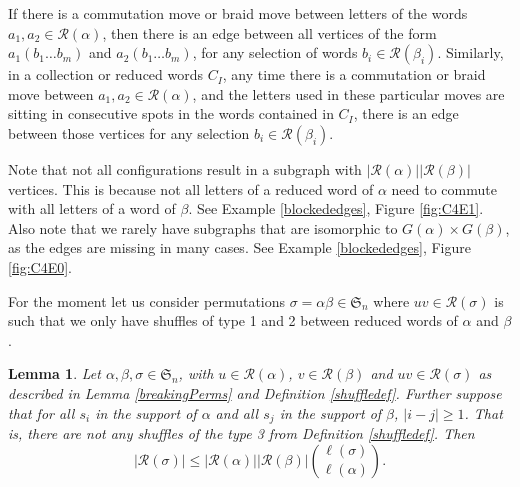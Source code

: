 \documentclass[11pt,reqno]{amsart}
\newtheorem{lemma}[theorem]{Lemma}
\theoremstyle{definition}
\theoremstyle{notation}
\newcommand{\calR}{\mathcal{R}}
\begin{document}
If there is a commutation move or braid move between letters of the words $a_1, a_2 \in \calR(\alpha)$, then there is an edge between all vertices of the form $a_1(b_1\ldots b_m)$ and $a_2(b_1\ldots b_m)$, for any selection of words $b_i\in \calR(\beta_i)$. Similarly, in a collection or reduced words $C_I$, any time there is a commutation or braid move between $a_1, a_2 \in \calR(\alpha)$, and the letters used in these particular moves are sitting in consecutive spots in the words contained in $C_I$, there is an edge between those vertices for any selection $b_i\in \calR(\beta_i)$.
 
Note that not all configurations result in a subgraph with $|\calR(\alpha)||\calR(\beta)|$ vertices. This is because not all letters of a reduced word of $\alpha$ need to commute with all letters of a word of $\beta$. See Example \ref{blockededges}, Figure \ref{fig:C4E1}. Also note that  we rarely have subgraphs that are isomorphic to $G(\alpha) \times G(\beta)$, as the edges are missing in many cases. See Example \ref{blockededges}, Figure \ref{fig:C4E0}.

For the moment let us consider permutations $\sigma = \alpha \beta \in \mathfrak{S}_n$ where $uv\in \calR(\sigma)$ is such that we only have shuffles of type 1 and 2 between reduced words of $\alpha$ and $\beta$.

\begin{lemma}\label{filteringlemma}
Let $\alpha, \beta, \sigma\in \mathfrak{S}_n$, with $u\in \calR(\alpha)$, $v\in \calR(\beta)$ and $uv\in \calR(\sigma)$ as described in Lemma \ref{breakingPerms} and Definition \ref{shuffledef}. Further suppose that for all $s_i$ in the support of $\alpha$ and all $s_j$ in the support of $\beta$, $|i-j|\geq 1$. That is, there are not any shuffles of the type 3 from Definition \ref{shuffledef}. Then
\[
|\calR(\sigma)|\leq |\calR(\alpha)||\calR(\beta)|\binom{\ell(\sigma)}{\ell(\alpha)}.
\]
\end{lemma}
\end{document}

